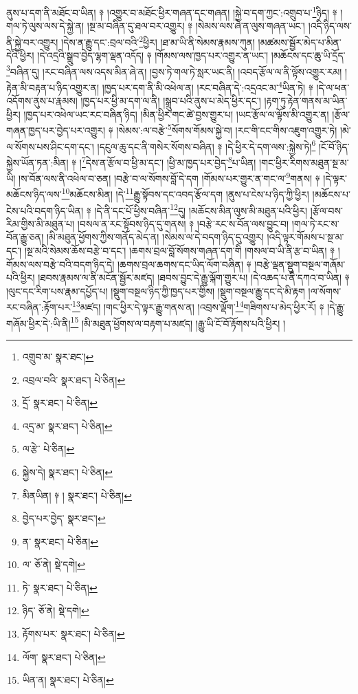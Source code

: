 ནུས་པ་དག་ནི་མཐོང་བ་ཡིན། ༈ །འགྱུར་བ་མཐོང་ཕྱིར་གཞན་དང་གཞན། །སྐྱེ་བ་དག་ཀྱང་:འགྲུབ་པ་\footnote{འགྲུབ་མ་  སྣར་ཐང་། }ཉིད། ༈ །གལ་ཏེ་ལུས་ལས་དེ་སྐྱེ་ན། །སྔ་མ་བཞིན་དུ་ཐལ་བར་འགྱུར། ༈ །སེམས་ལས་ཞེ་ན་ལུས་གཞན་ཡང་། །འདི་ཉིད་ལས་ནི་སྐྱེ་བར་འགྱུར། །དེས་ན་རྒྱུ་དང་:བྲལ་བའི་\footnote{འབྲལ་བའི་  སྣར་ཐང་།  པེ་ཅིན། }ཕྱིར། །ཐ་མ་ཡི་ནི་སེམས་རྣམས་ཀུན། །མཚམས་སྦྱོར་མེད་པ་མིན་དེའི་ཕྱིར། །དེ་འདྲའི་སྒྲུབ་བྱེད་ལྷག་ལྡན་འདོད། ༈ །གོམས་ལས་ཁྱད་པར་འགྱུར་ན་ཡང་། །མཆོངས་དང་ཆུ་ཡི་དྲོད་\footnote{དྲོ་  སྣར་ཐང་།  པེ་ཅིན། }བཞིན་དུ། །རང་བཞིན་ལས་འདས་མིན་ཞེ་ན། །བྱས་ཏེ་གལ་ཏེ་སླར་ཡང་ནི། །འབད་རྩོལ་ལ་ནི་ལྟོས་འགྱུར་རམ། །རྟེན་མི་བརྟན་པ་ཉིད་འགྱུར་ན། །ཁྱད་པར་དག་ནི་མི་འཕེལ་ན། །རང་བཞིན་དེ་:འདྲའང་མ་\footnote{འདྲ་མ་  སྣར་ཐང་།  པེ་ཅིན། }ཡིན་ཏེ། ༈ །དེ་ལ་ཕན་འདོགས་ནུས་པ་རྣམས། །ཁྱད་པར་ཕྱི་མ་དག་ལ་ནི། །སྒྲུབ་པའི་ནུས་པ་མེད་ཕྱིར་དང་། །རྟག་ཏུ་རྟེན་གནས་མ་ཡིན་ཕྱིར། །ཁྱད་པར་འཕེལ་ཡང་རང་བཞིན་ཉིད། །མིན་ཕྱིར་གང་ཚེ་བྱས་གྱུར་པ། །ཡང་རྩོལ་ལ་ལྟོས་མི་འགྱུར་ན། །རྩོལ་གཞན་ཁྱད་པར་བྱེད་པར་འགྱུར། ༈ །སེམས་:ལ་བརྩེ་\footnote{ལ་རྩེ་  པེ་ཅིན། }སོགས་གོམས་སྐྱེ་བ། །རང་གི་ངང་གིས་འཇུག་འགྱུར་ཏེ། །མེ་ལ་སོགས་པས་ཤིང་དག་དང་། །དངུལ་ཆུ་དང་ནི་གསེར་སོགས་བཞིན། ༈ །དེ་ཕྱིར་དེ་དག་ལས་:སྐྱེས་ཏེ།\footnote{སྐྱེས་དེ།  སྣར་ཐང་།  པེ་ཅིན། } །ངོ་བོ་ཉིད་སྐྱེས་ཡོན་ཏན་:མིན། ༈ །\footnote{མིནཡིན། ༈ །  སྣར་ཐང་།  པེ་ཅིན། }དེས་ན་རྩོལ་བ་ཕྱི་མ་དང་། །ཕྱི་མ་ཁྱད་པར་བྱེད་\footnote{བྱེད་པར་བྱེད་  སྣར་ཐང་། }པ་ཡིན། །གང་ཕྱིར་རིགས་མཐུན་སྔ་མ་ཡི། །ས་བོན་ལས་ནི་འཕེལ་བ་ཅན། །བརྩེ་བ་ལ་སོགས་བློ་དེ་དག །གོམས་པར་གྱུར་ན་གང་ལ་\footnote{ན་  སྣར་ཐང་།  པེ་ཅིན། }གནས། ༈ །དེ་ལྟར་མཆོངས་ཉིད་ལས་\footnote{ལ་  ཅོ་ནེ།  སྡེ་དགེ། }མཆོངས་མིན། །དེ་\footnote{ཏེ་  སྣར་ཐང་།  པེ་ཅིན། }རྒྱུ་སྟོབས་དང་འབད་རྩོལ་དག །ནུས་པ་ངེས་པ་ཉིད་ཀྱི་ཕྱིར། །མཆོངས་པ་ངེས་པའི་བདག་ཉིད་ཡིན། ༈ །དེ་ནི་དང་པོ་ཕྱིས་བཞིན་\footnote{ཉིད་  ཅོ་ནེ།  སྡེ་དགེ། }དུ། །མཆོངས་མིན་ལུས་མི་མཐུན་པའི་ཕྱིར། །རྩོལ་བས་རིམ་གྱིས་མི་མཐུན་པ། །བསལ་ན་རང་སྟོབས་ཉིད་དུ་གནས། ༈ །བརྩེ་རང་ས་བོན་ལས་བྱུང་བ། །གལ་ཏེ་རང་ས་བོན་རྒྱུ་ཅན། །མི་མཐུན་ཕྱོགས་ཀྱིས་གནོད་མེད་ན། །སེམས་ལ་དེ་བདག་ཉིད་དུ་འགྱུར། །འདི་ལྟར་གོམས་པ་སྔ་མ་དང་། །སྔ་མའི་སེམས་ཆོས་བརྩེ་བ་དང་། །ཆགས་བྲལ་བློ་སོགས་གཞན་དག་གི །གསལ་བ་ཡི་ནི་རྩ་བ་ཡིན། ༈ །གོམས་ལས་བརྩེ་བའི་བདག་ཉིད་དེ། །ཆགས་བྲལ་ཆགས་དང་ཡིད་ལོག་བཞིན། ༈ །བརྩེ་ལྡན་སྡུག་བསྔལ་གཞོམ་པའི་ཕྱིར། །ཐབས་རྣམས་ལ་ནི་མངོན་སྦྱོར་མཛད། །ཐབས་བྱུང་དེ་རྒྱུ་ལྐོག་གྱུར་པ། །དེ་འཆད་པ་ནི་དཀའ་བ་ཡིན། ༈ །ལུང་དང་རིག་པས་རྣམ་དཔྱོད་པ། །སྡུག་བསྔལ་ཉིད་ཀྱི་ཁྱད་པར་གྱིས། །སྡུག་བསྔལ་རྒྱུ་དང་དེ་མི་རྟག །ལ་སོགས་རང་བཞིན་:རྟོག་པར་\footnote{རྟོགས་པར་  སྣར་ཐང་།  པེ་ཅིན། }མཛད། །གང་ཕྱིར་དེ་ལྟར་རྒྱུ་གནས་ན། །འབྲས་ལྡོག་\footnote{ལོག་  སྣར་ཐང་།  པེ་ཅིན། }གཟིགས་པ་མེད་ཕྱིར་རོ། ༈ །དེ་རྒྱུ་གཞོམ་ཕྱིར་དེ་:ཡི་ནི།\footnote{ཡིན་ན།  སྣར་ཐང་།  པེ་ཅིན། } །མི་མཐུན་ཕྱོགས་ལ་བརྟག་པ་མཛད། །རྒྱུ་ཡི་ངོ་བོ་རྟོགས་པའི་ཕྱིར། །
